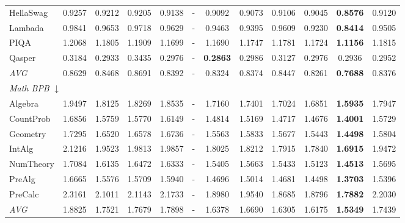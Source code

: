 \begin{table}[htbp]
\begin{tabular}{lccccccccccc}
HellaSwag & 0.9257 & 0.9212 & 0.9205 & 0.9138 & - & 0.9092 & 0.9073 & 0.9106 & 0.9045 & \textbf{0.8576} & 0.9120 \\
Lambada & 0.9841 & 0.9653 & 0.9718 & 0.9629 & - & 0.9463 & 0.9395 & 0.9609 & 0.9230 & \textbf{0.8414} & 0.9505 \\
PIQA & 1.2068 & 1.1805 & 1.1909 & 1.1699 & - & 1.1690 & 1.1747 & 1.1781 & 1.1724 & \textbf{1.1156} & 1.1815 \\
Qasper & 0.3184 & 0.2933 & 0.3435 & 0.2976 & - & \textbf{0.2863} & 0.2986 & 0.3127 & 0.2976 & 0.2936 & 0.2952 \\
\textit{AVG} & 0.8629 & 0.8468 & 0.8691 & 0.8392 & - & 0.8324 & 0.8374 & 0.8447 & 0.8261 & \textbf{0.7688} & 0.8376 \\
\midrule
\multicolumn{12}{l}{\textit{Math BPB} $\downarrow$} \\
Algebra & 1.9497 & 1.8125 & 1.8269 & 1.8535 & - & 1.7160 & 1.7401 & 1.7024 & 1.6851 & \textbf{1.5935} & 1.7947 \\
CountProb & 1.6856 & 1.5759 & 1.5770 & 1.6149 & - & 1.4814 & 1.5169 & 1.4717 & 1.4676 & \textbf{1.4001} & 1.5729 \\
Geometry & 1.7295 & 1.6520 & 1.6578 & 1.6736 & - & 1.5563 & 1.5833 & 1.5677 & 1.5443 & \textbf{1.4498} & 1.5804 \\
IntAlg & 2.1216 & 1.9523 & 1.9813 & 1.9857 & - & 1.8025 & 1.8212 & 1.7915 & 1.7840 & \textbf{1.6915} & 1.9472 \\
NumTheory & 1.7084 & 1.6135 & 1.6472 & 1.6333 & - & 1.5405 & 1.5663 & 1.5433 & 1.5123 & \textbf{1.4513} & 1.5695 \\
PreAlg & 1.6665 & 1.5576 & 1.5709 & 1.5940 & - & 1.4696 & 1.5014 & 1.4681 & 1.4498 & \textbf{1.3703} & 1.5396 \\
PreCalc & 2.3161 & 2.1011 & 2.1143 & 2.1733 & - & 1.8980 & 1.9540 & 1.8685 & 1.8796 & \textbf{1.7882} & 2.2030 \\
\textit{AVG} & 1.8825 & 1.7521 & 1.7679 & 1.7898 & - & 1.6378 & 1.6690 & 1.6305 & 1.6175 & \textbf{1.5349} & 1.7439 \\
\bottomrule
\end{tabular}
\end{table}

